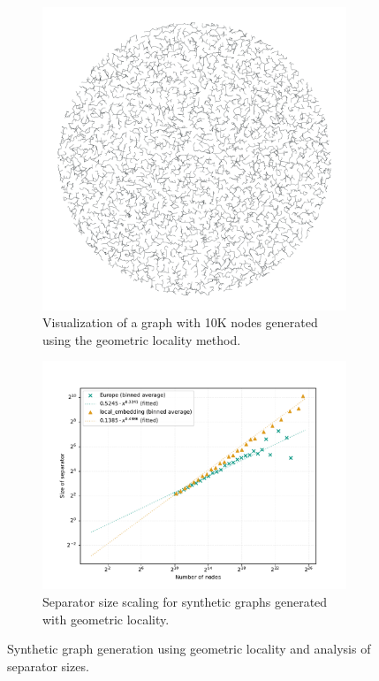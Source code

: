 \begin{figure}
	\begin{subfigure}{0.35\linewidth}
		\centering
		\includegraphics[width=\linewidth]{graphics/local_embedding.png}
		\caption{Visualization of a graph with 10K nodes generated using the geometric locality method.}
		\label{fig:geometric_locality_graph_viz}
	\end{subfigure}
	\hfill
	\begin{subfigure}{0.55\linewidth}
		\centering
		\includegraphics[width=\linewidth]{graphics/sep_local_embedding.pdf}
		\caption{Separator size scaling for synthetic graphs generated with geometric locality.}
		\label{fig:geometric_locality_sep_plot}
	\end{subfigure}
	\caption{Synthetic graph generation using geometric locality and analysis of separator sizes.}
	\label{fig:geometric_locality_separators}
\end{figure}

